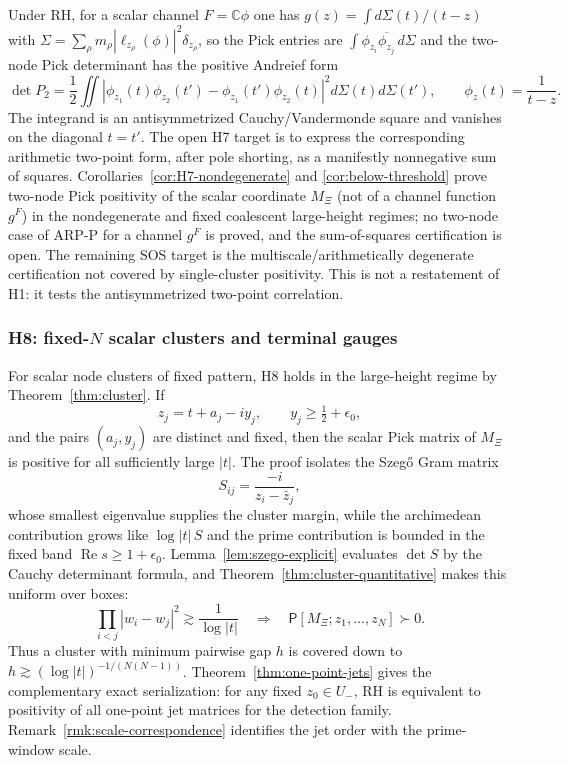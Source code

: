 \documentclass[11pt]{amsart}
\theoremstyle{definition}
\theoremstyle{remark}
\theoremstyle{definition}
\renewcommand{\Re}{\operatorname{Re}}
\newcommand{\half}{\tfrac{1}{2}}
\newcommand{\C}{\mathbb{C}}
\begin{document}
Under RH, for a scalar channel $F=\C\phi$ one has $g(z)=\int d\Sigma(t)/(t-z)$ with
$\Sigma=\sum_\rho m_\rho|\ell_{z_\rho}(\phi)|^2\delta_{z_\rho}$, so the Pick entries are
$\int\phi_{z_i}\overline{\phi_{z_j}}\,d\Sigma$ and the two-node Pick determinant has the positive
Andreief form
\[
   \det P_2
   =
   \frac12
   \iint
   \left|
      \phi_{z_1}(t)\phi_{z_2}(t')
      -
      \phi_{z_1}(t')\phi_{z_2}(t)
   \right|^2
   d\Sigma(t)d\Sigma(t'),
   \qquad
   \phi_z(t)=\frac1{t-z}.
\]
The integrand is an antisymmetrized Cauchy/Vandermonde square and vanishes on the diagonal $t=t'$.  The
open H7 target is to express the corresponding arithmetic two-point form, after pole shorting, as a
manifestly nonnegative sum of squares.  Corollaries~\ref{cor:H7-nondegenerate} and
\ref{cor:below-threshold} prove two-node Pick positivity of the scalar coordinate $M_\Xi$ (not of a
channel function $g^F$) in the nondegenerate and fixed coalescent large-height regimes; no two-node case
of ARP-P for a channel $g^F$ is proved, and the sum-of-squares certification is open.  The remaining SOS target is the multiscale/arithmetically degenerate certification not covered by
single-cluster positivity.  This is not a restatement of H1: it tests the antisymmetrized two-point
correlation.

\subsubsection*{H8: fixed-$N$ scalar clusters and terminal gauges}

For scalar node clusters of fixed pattern, H8 holds in the large-height regime by
Theorem~\ref{thm:cluster}.  If
\[
   z_j=t+a_j-iy_j,\qquad y_j\ge\half+\epsilon_0,
\]
and the pairs $(a_j,y_j)$ are distinct and fixed, then the scalar Pick matrix of $M_\Xi$ is positive
for all sufficiently large $|t|$.  The proof isolates the Szeg\H{o} Gram matrix
\[
   S_{ij}=\frac{-i}{z_i-\bar z_j},
\]
whose smallest eigenvalue supplies the cluster margin, while the archimedean contribution grows like
$\log |t|\,S$ and the prime contribution is bounded in the fixed band $\Re s\ge1+\epsilon_0$.
Lemma~\ref{lem:szego-explicit} evaluates $\det S$ by the Cauchy determinant formula, and
Theorem~\ref{thm:cluster-quantitative} makes this uniform over boxes:
\[
   \prod_{i<j}|w_i-w_j|^2\gtrsim\frac1{\log |t|}
   \quad\Longrightarrow\quad
   \mathsf P[M_\Xi;z_1,\ldots,z_N]\succ0.
\]
Thus a cluster with minimum pairwise gap $h$ is covered down to
$h\gtrsim(\log|t|)^{-1/(N(N-1))}$.
Theorem~\ref{thm:one-point-jets} gives the complementary exact serialization: for any fixed
$z_0\in U_-$, RH is equivalent to positivity of all one-point jet matrices for the detection family.
Remark~\ref{rmk:scale-correspondence} identifies the jet order with the prime-window scale.
\end{document}
